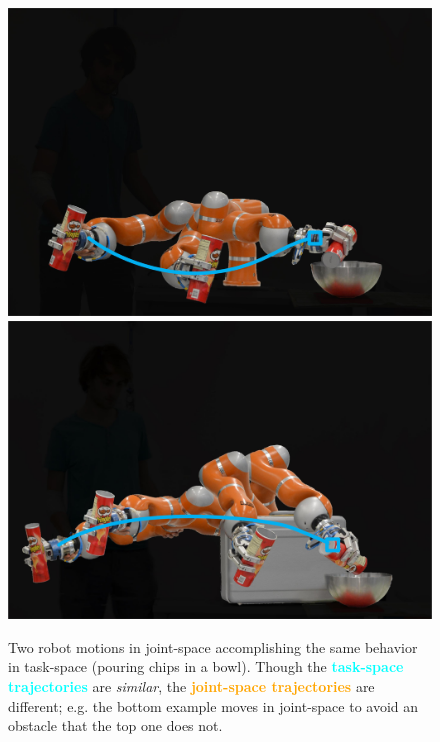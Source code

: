 \documentclass[letterpaper, 10 pt, conference,fleqn]{ieeeconf}
\begin{document}
\begin{figure}[t]
\centering
\includegraphics[scale=.23,trim={0 0 0 14.0cm},clip]{Without_Obstcle.jpg}
\includegraphics[scale=.23,trim={0 0 0 9.cm},clip]{With_Obstcle.jpg}
\caption{Two robot motions in joint-space accomplishing the same behavior in task-space (pouring chips in a bowl). Though the \textcolor{cyan}{\textbf{task-space trajectories}} are \textit{similar}, the \textcolor{orange}{\textbf{joint-space trajectories}} are different; e.g. the bottom example moves in joint-space to avoid an obstacle that the top one does not.}
\label{fig:robot_example}
\vspace{-0.6cm}
\end{figure}
\end{document}
